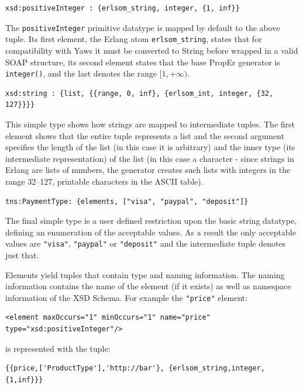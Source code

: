 \documentclass[submission,copyright]{eptcs}
\begin{document}
\begin{lstlisting}
xsd:positiveInteger : {erlsom_string, integer, {1, inf}}
\end{lstlisting}

The \texttt{positiveInteger} primitive datatype is mapped by default to the
above tuple.  Its first element, the Erlang atom \texttt{erlsom\_string}, states
that for compatibility with Yaws it must be converted to String before wrapped
in a valid SOAP structure, its second element states that the base PropEr
generator is \texttt{integer()}, and the last denotes the range $[1,+\infty)$. 

\begin{lstlisting}
xsd:string : {list, {{range, 0, inf}, {erlsom_int, integer, {32, 127}}}}
\end{lstlisting}

This simple type shows how strings are mapped to intermediate tuples. The first 
element shows that the entire tuple represents a list and the second argument 
specifies the length of the list (in this case it is arbitrary) and the inner type 
(its intermediate representation) of the list (in this case a character - since 
strings in Erlang are lists of numbers, the generator creates such lists with 
integers in the range 32--127, printable characters in the ASCII table).

\begin{lstlisting}
tns:PaymentType: {elements, ["visa", "paypal", "deposit"]}
\end{lstlisting}

The final simple type is a user defined restriction upon the basic
string datatype, defining an enumeration of the acceptable values. As
a result the only acceptable values are \texttt{"visa"},
\texttt{"paypal"} or \texttt{"deposit"} and the intermediate tuple
denotes just that.

Elements yield tuples that contain type and naming information. The
naming information contains the name of the element (if it exists) as
well as namespace information of the XSD Schema. For example the
\texttt{"price"} element:
\begin{lstlisting}
<element maxOccurs="1" minOccurs="1" name="price" type="xsd:positiveInteger"/>
\end{lstlisting}
is represented with the tuple:
\begin{lstlisting}
{{price,['ProductType'],'http://bar'}, {erlsom_string,integer,{1,inf}}}
\end{lstlisting}
\end{document}
